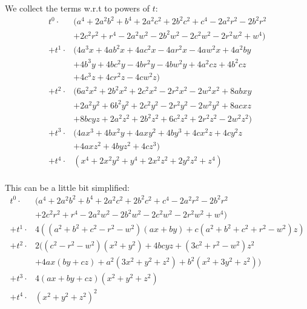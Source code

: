 \documentclass[12pt,a4paper]{amsart}
\numberwithin{equation}{section}
\theoremstyle{plain}
\theoremstyle{definition}
\begin{document}
We collect the terms w.r.t to powers of $t$:
\begin{align*}
   t^0 \cdot &( a^4+2 a^2 b^2+b^4+2 a^2 c^2+2 b^2 c^2+c^4-2 a^2 r^2-2 b^2 r^2 \\
             &+ 2 c^2 r^2+r^4-2 a^2 w^2-2 b^2 w^2-2 c^2 w^2-2 r^2 w^2+w^4) \\
  +t^1 \cdot &(4 a^3 x+4 a b^2 x+4 a c^2 x-4 a r^2 x-4 a w^2 x+4 a^2 b y \\
             &+4 b^3 y+4 b c^2 y-4 b r^2 y-4 b w^2 y+4 a^2 c z+4 b^2 c z \\
             &+4 c^3 z+4 c r^2 z-4 c w^2 z) \\
  +t^2 \cdot &(6 a^2 x^2+2 b^2 x^2+2 c^2 x^2-2 r^2 x^2-2 w^2 x^2+8 a b x y \\
             &+2 a^2 y^2+6 b^2 y^2+2 c^2 y^2-2 r^2 y^2-2 w^2 y^2+8 a c x z \\
             &+8 b c y z+2 a^2 z^2+2 b^2 z^2+6 c^2 z^2+2 r^2 z^2-2 w^2 z^2) \\
  +t^3 \cdot &(4 a x^3+4 b x^2 y+4 a x y^2+4 b y^3+4 c x^2 z+4 c y^2 z \\
             &+4 a x z^2+4 b y z^2+4 c z^3) \\
  +t^4 \cdot &(x^4+2 x^2 y^2+y^4+2 x^2 z^2+2 y^2 z^2+z^4)
\end{align*}\\

This can be a little bit simplified:
\begin{align*}
   t^0 \cdot &( a^4+2 a^2 b^2+b^4+2 a^2 c^2+2 b^2 c^2+c^4-2 a^2 r^2-2 b^2 r^2 \\
             &+ 2 c^2 r^2+r^4-2 a^2 w^2-2 b^2 w^2-2 c^2 w^2-2 r^2 w^2+w^4) \\
  +t^1 \cdot &4((a^2+b^2+c^2-r^2-w^2) (a x+b y)+c (a^2+b^2+c^2+r^2-w^2) z) \\
  +t^2 \cdot &2((c^2-r^2-w^2) (x^2+y^2)+4 b c y z+(3 c^2+r^2-w^2) z^2 \\
             &+4 a x (b y+c z)+a^2 (3 x^2+y^2+z^2)+b^2 (x^2+3 y^2+z^2)) \\
  +t^3 \cdot &4(a x+b y+c z) (x^2+y^2+z^2) \\
  +t^4 \cdot &(x^2+y^2+z^2)^2
\end{align*}
\end{document}
